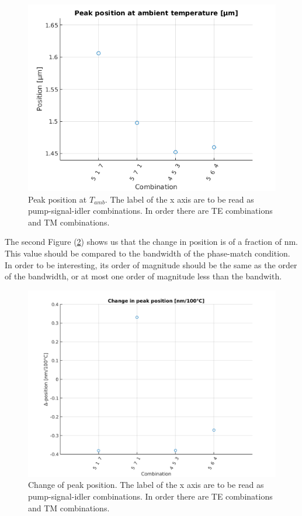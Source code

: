 \documentclass[12pt,a4paper,twoside]{article}
\begin{document}
\begin{figure}[!h]
	\centering
	\includegraphics[width=.85\textwidth]{ppaat22.png}
	\caption{Peak position at $T_{amb}$. The label of the x axis are to be read as pump-signal-idler combinations. In order there are TE combinations and TM combinations.}
	\label{fig_sym_pp@t2} 	%
\end{figure}

The second Figure (\ref{fig_sym_ppc2}) shows us that the change in position is of a fraction of \si{\nm}.
This value should be compared to the bandwidth of the phase-match condition.
In order to be interesting, its order of magnitude should be the same as the order of the bandwidth, or at most one order of magnitude less than the bandwith.

\begin{figure}[ht]
	\centering
	\includegraphics[width=.85\textwidth]{ppc2.png}
	\caption{Change of peak position. The label of the x axis are to be read as pump-signal-idler combinations. In order there are TE combinations and TM combinations.}
	\label{fig_sym_ppc2} %
\end{figure}
\end{document}
